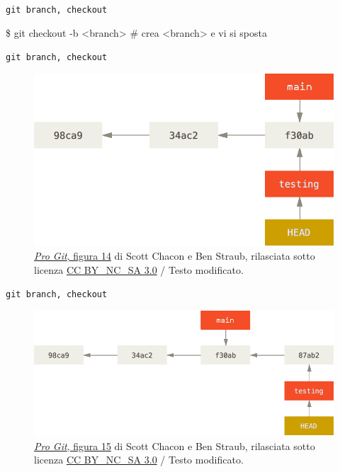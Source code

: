 \documentclass{beamer}
\begin{document}
\begin{frame}{\texttt{git branch, checkout}}
  \begin{semiverbatim}
    \$ git checkout -b <branch> \# crea <branch> e vi si sposta
  \end{semiverbatim}
\end{frame}

\begin{frame}{\texttt{git branch, checkout}}
  \begin{figure}
    \includegraphics[width=\textwidth]{assets/head-to-testing.png}
    \caption{
      \href{https://git-scm.com/book/en/v2/Git-Branching-Branches-in-a-Nutshell}{\emph{Pro Git},
      figura 14} di Scott Chacon e Ben Straub, rilasciata sotto licenza
      \href{https://creativecommons.org/licenses/by-nc-sa/3.0/}{CC
      BY\_NC\_SA 3.0} / Testo modificato.
    }
  \end{figure}
\end{frame}

\begin{frame}{\texttt{git branch, checkout}}
  \begin{figure}
    \includegraphics[width=\textwidth]{assets/advance-testing.png}
    \caption{
      \href{https://git-scm.com/book/en/v2/Git-Branching-Branches-in-a-Nutshell}{\emph{Pro Git},
      figura 15} di Scott Chacon e Ben Straub, rilasciata sotto licenza
      \href{https://creativecommons.org/licenses/by-nc-sa/3.0/}{CC
      BY\_NC\_SA 3.0} / Testo modificato.
    }
  \end{figure}
\end{frame}
\end{document}
